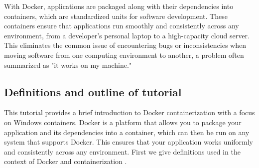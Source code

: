 \documentclass{article}
\begin{document}
With Docker, applications are packaged along with their dependencies into containers, which are standardized units for software development. These containers ensure that applications run smoothly and consistently across any environment, from a developer's personal laptop to a high-capacity cloud server. This eliminates the common issue of encountering bugs or inconsistencies when moving software from one computing environment to another, a problem often summarized as "it works on my machine."

\subsection{Definitions and outline of tutorial}
This tutorial provides a brief introduction to Docker containerization with a focus on Windows containers. Docker is a platform that allows you to package your application and its dependencies into a container, which can then be run on any system that supports Docker. This ensures that your application works uniformly and consistently across any environment. First we give definitions used in the context of Docker and containerization \cite{docker}.
\end{document}
